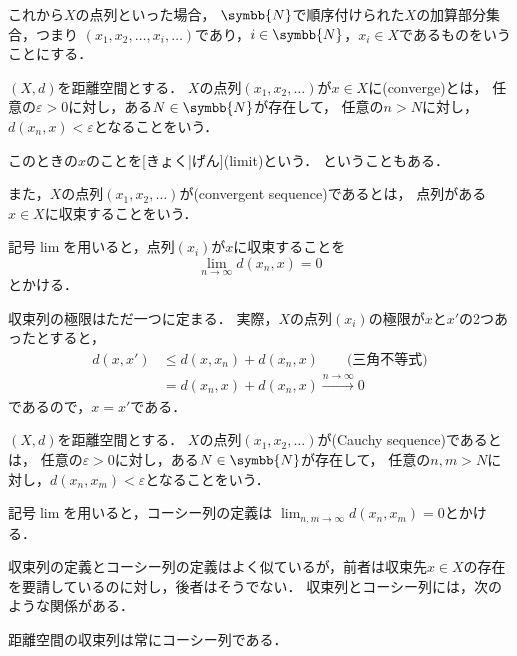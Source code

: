 \documentclass[../sotsu.tex]{subfiles}
\begin{document}
これから$X$の点列といった場合，
$\symbb{N}$で順序付けられた$X$の加算部分集合，つまり
$(x_1, x_2, \dots, x_i, \dotsc)$であり，$i \in \symbb{N}$，$x_i \in X$であるものをいうことにする．

\begin{definition}[収束列]
    \label{dfn:convergent-sequence}
    $(X, d)$を距離空間とする．
    $X$の点列$(x_1, x_2, \dotsc)$が$x \in X$に(converge)とは，
    任意の$\varepsilon > 0$に対し，ある$N \in \symbb{N}$が存在して，
    任意の$n > N$に対し，$d(x_n, x) < \varepsilon$となることをいう．
    
    このときの$x$のことを[きょく|げん](limit)という．
    ということもある．

    また，$X$の点列$(x_1, x_2, \dotsc)$が(convergent sequence)であるとは，
    点列がある$x \in X$に収束することをいう．
\end{definition}

記号$\lim$を用いると，点列$(x_i)$が$x$に収束することを
\[  \lim_{n \to \infty} d(x_n, x) = 0  \]
とかける．

収束列の極限はただ一つに定まる．
実際，$X$の点列$(x_i)$の極限が$x$と$x'$の2つあったとすると，
\begin{equation*}
    \begin{split}
        d(x, x') &\leq d(x, x_n) + d(x_n, x)  \qquad \text{(三角不等式)}  \\
            &= d(x_n, x) + d(x_n, x)  
            \xrightarrow{n \to \infty} 0
    \end{split}
\end{equation*}
であるので，$x = x'$である．


\begin{definition}[コーシー列]
    \label{dfn:Cauchy-sequence}
    $(X, d)$を距離空間とする．
    $X$の点列$(x_1, x_2, \dotsc)$が(Cauchy sequence)であるとは，
    任意の$\varepsilon > 0$に対し，ある$N \in \symbb{N}$が存在して，
    任意の$n, m > N$に対し，$ d(x_n, x_m) < \varepsilon $となることをいう．
\end{definition}

記号$\lim$を用いると，コーシー列の定義は
$\lim_{n, m \to \infty} d(x_n, x_m) = 0$とかける．

収束列の定義とコーシー列の定義はよく似ているが，前者は収束先$x \in X$の存在を要請しているのに対し，後者はそうでない．
収束列とコーシー列には，次のような関係がある．
\begin{theorem}
    \label{thm:convergent-is-Cauchy}
    距離空間の収束列は常にコーシー列である．
\end{theorem}
\end{document}
